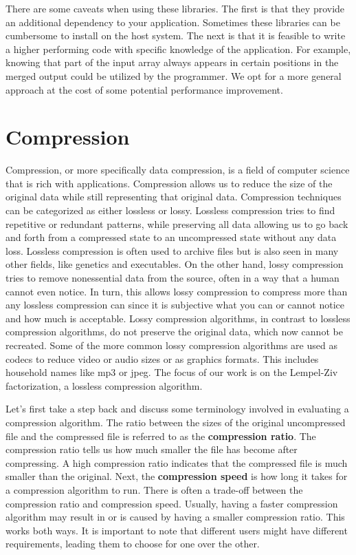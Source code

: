 There are some caveats when using these libraries.
The first is that they provide an additional dependency to your application.
Sometimes these libraries can be cumbersome to install on the host system.
The next is that it is feasible to write a higher performing code with specific knowledge of the application.
For example, knowing that part of the input array always appears in certain positions in the merged output could be utilized by the programmer.
We opt for a more general approach at the cost of some potential performance improvement.

\section{Compression}

Compression, or more specifically data compression, is a field of computer science that is rich with applications.
Compression allows us to reduce the size of the original data while still representing that original data.
Compression techniques can be categorized as either lossless or lossy.
Lossless compression tries to find repetitive or redundant patterns, while preserving all data allowing us to go back and forth from a compressed state to an uncompressed state without any data loss. 
Lossless compression is often used to archive files but is also seen in many other fields, like genetics and executables.
On the other hand, lossy compression tries to remove nonessential data from the source, often in a way that a human cannot even notice.
In turn, this allows lossy compression to compress more than any lossless compression can since it is subjective what you can or cannot notice and how much is acceptable.
Lossy compression algorithms, in contrast to lossless compression algorithms, do not preserve the original data, which now cannot be recreated.
Some of the more common lossy compression algorithms are used as codecs to reduce video or audio sizes or as graphics formats.
This includes household names like mp3 or jpeg.
The focus of our work is on the Lempel-Ziv factorization, a lossless compression algorithm.

Let's first take a step back and discuss some terminology involved in evaluating a compression algorithm.
The ratio between the sizes of the original uncompressed file and the compressed file is referred to as the \textbf{compression ratio}.
The compression ratio tells us how much smaller the file has become after compressing.
A high compression ratio indicates that the compressed file is much smaller than the original.
Next, the \textbf{compression speed} is how long it takes for a compression algorithm to run.
There is often a trade-off between the compression ratio and compression speed.
Usually, having a faster compression algorithm may result in or is caused by having a smaller compression ratio.
This works both ways.
It is important to note that different users might have different requirements, leading them to choose for one over the other.

